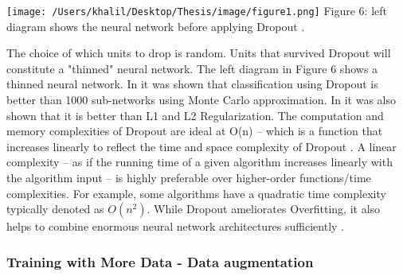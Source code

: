 \documentclass[oneside,12pt,article]{article}
\begin{document}
\begin{center}
\texttt{[image: /Users/khalil/Desktop/Thesis/image/figure1.png]}
Figure 6: left diagram shows the neural network before applying Dropout \cite{srivastava2014dropout}. 
\end{center}
The choice of which units to drop is random. Units that survived Dropout will constitute a "thinned" neural network. The left diagram in Figure 6 shows a thinned neural network. In \cite{srivastava2014dropout}\cite{bengio2017deep} it was shown that classification using Dropout is better than 1000 sub-networks using Monte Carlo approximation. In \cite{srivastava2014dropout} it was also shown that it is better than L1 and L2 Regularization. The computation and memory complexities of Dropout are ideal at O(n) – which is a function that increases linearly to reflect the time and space complexity of Dropout \cite{moradi2020survey}. A linear complexity – as if the running time of a given algorithm increases linearly with the algorithm input – is highly preferable over higher-order functions/time complexities. For example, some algorithms have a quadratic time complexity typically denoted as $O(n^2)$. While Dropout ameliorates Overfitting, it also helps to combine enormous neural network architectures sufficiently \cite{srivastava2014dropout}.  

\subsubsection {Training with More Data - Data augmentation} 
\end{document}
